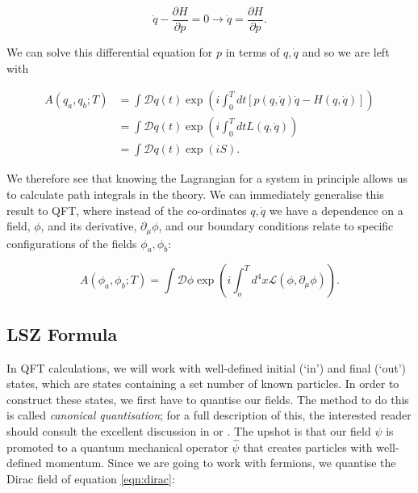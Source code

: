 \begin{equation}
\dot{q} - \frac{\partial H}{\partial p} = 0 \to \dot{q} = \frac{\partial H}{\partial p}.
\end{equation}

We can solve this differential equation for $p$ in terms of $q, \dot{q}$ and so we are left with

\begin{equation}
\begin{split}
A(q_a, q_b;T) &=  \int \mathcal{D}q(t) \exp \left(i \int_0^T dt [p(q,\dot{q}) \dot{q} - H(q,\dot{q})] \right) \\
&= \int \mathcal{D}q(t) \exp \left(i \int_0^T dt L(q,\dot{q}) \right) \\
&= \int \mathcal{D}q(t) \exp \left(i S \right).
\end{split}
\end{equation}

We therefore see that knowing the Lagrangian for a system in principle allows us to calculate path integrals in the theory. We can immediately generalise this result to QFT, where instead of the co-ordinates $q, \dot{q}$ we have a dependence on a field, $\phi$, and its derivative, $\partial_\mu \phi$, and our boundary conditions relate to specific configurations of the fields $\phi_a, \phi_b$:

\begin{equation}
A(\phi_a, \phi_b;T) = \int \mathcal{D}\phi \exp \left(i \int_o^T d^4 x \mathscr{L}(\phi, \partial_\mu \phi) \right).
\end{equation}

\subsection{LSZ Formula}

In QFT calculations, we will work with well-defined initial (`in') and final (`out') states, which are states containing a set number of known particles. In order to construct these states, we first have to quantise our fields. The method to do this is called \emph{canonical quantisation}; for a full description of this, the interested reader should consult the excellent discussion in \cite{Peskin1995} or \cite{Srednicki2007}. The upshot is that our field $\psi$ is promoted to a quantum mechanical operator $\hat{\psi}$ that creates particles with well-defined momentum. Since we are going to work with fermions, we quantise the Dirac field of equation \ref{eqn:dirac}:

